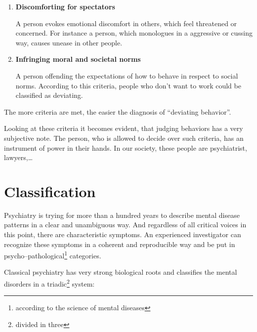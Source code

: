 \documentclass[../main.tex]{subfiles}
\begin{document}
\begin{enumerate}
\item \textbf{Discomforting for spectators}

  A person evokes emotional discomfort in others, which feel threatened or concerned.
  For instance a person, which monologues in a aggressive or cussing way, causes unease in other people.

\item \textbf{Infringing moral and societal norms}

  A person offending the expectations of how to behave in respect to social norms.
  According to this criteria, people who don't want to work could be classified as deviating.
  
\end{enumerate}

\noindent The more criteria are met, the easier the diagnosis of ``deviating behavior''.

\vspace{5mm}

Looking at these criteria it becomes evident, that judging behaviors has a very subjective note.
The person, who is allowed to decide over such criteria, has an instrument of power in their hands.
In our society, these people are psychiatrist, lawyers,\ldots

\section{Classification}\label{sec:classif}

Psychiatry is trying for more than a hundred years to describe mental disease patterns in a clear and unambiguous way.
And regardless of all critical voices in this point, there are characteristic symptoms.
An experienced investigator can recognize these symptoms in a coherent and reproducible way and be
put in psycho--pathological\footnote{according to the science of mental diseases} categories. 

Classical psychiatry has very strong biological roots and classifies the mental disorders in a
triadic\footnote{divided in three} system:
\end{document}
